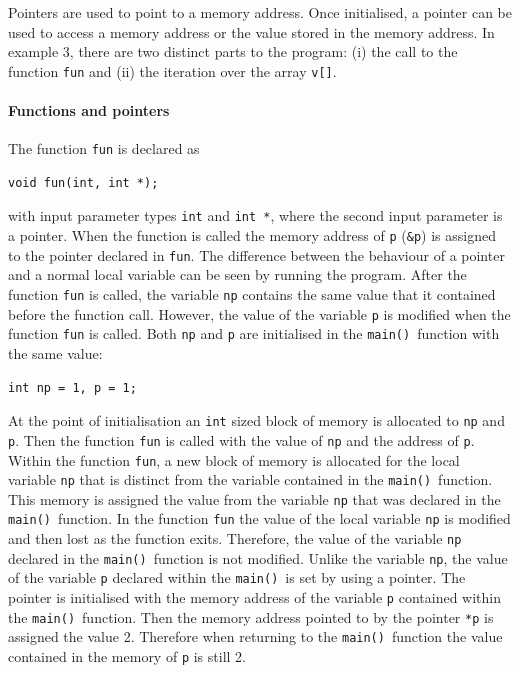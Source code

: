 \documentclass[11pt]{scrartcl}
\def\main{\texttt{main()}}
\begin{document}
Pointers are used to point to a memory address.  Once initialised, a pointer can be used to access a memory address or the value stored in the memory address.  In example 3, there are two distinct parts to the program: (i) the call to the function
\texttt{fun} and (ii) the iteration over the array \texttt{v[]}.

\paragraph{Functions and pointers}
The function \texttt{fun} is declared as 
\begin{lstlisting}
void fun(int, int *);
\end{lstlisting}
with input parameter types \texttt{int} and \texttt{int *}, where the second input parameter is a pointer.  When the function is called the memory address of \texttt{p} (\texttt{\&p}) is assigned to the pointer declared in \texttt{fun}.  The difference between the behaviour of a pointer and a normal local variable can be seen by running the program.  After the function \texttt{fun} is called, the variable \texttt{np} contains the same value that it contained before the function call.  However, the value of the variable \texttt{p} is modified when the function \texttt{fun} is called.  Both \texttt{np} and \texttt{p} are initialised in the \main\ function with the same value:
\begin{lstlisting}
int np = 1, p = 1;
\end{lstlisting}
At the point of initialisation an \texttt{int} sized block of memory is allocated to \texttt{np} and \texttt{p}.  Then the function
\texttt{fun} is called with the value of \texttt{np} and the
address of \texttt{p}.  Within the function \texttt{fun}, a new block
of memory is allocated for the local variable \texttt{np} that is distinct
from the variable contained in the \main\ function.  This memory is
assigned the value from the variable \texttt{np} that was declared in the \main\ function.  In the function \texttt{fun} the value of the local variable \texttt{np} is modified and then lost as the function exits.  Therefore, the value of the variable \texttt{np} declared in the \main\ function is not modified.
Unlike the variable \texttt{np}, the value of the variable \texttt{p} declared within the \main\ is set by using a pointer.  The pointer is initialised with the memory address of the variable \texttt{p} contained within the \main\
function.  Then the memory address pointed to by the pointer
\texttt{*p} is assigned the value 2.  Therefore when returning to the
\main\ function the value contained in the memory of \texttt{p} is
still 2.
\end{document}
